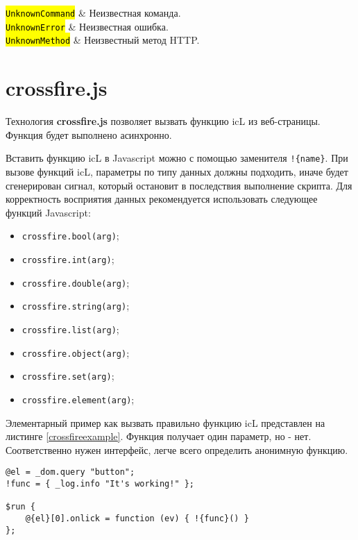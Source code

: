 \documentclass[a4paper, 14pt]{extarticle}
\newcommand{\ferror}[1]{\foreignlanguage{english}{\fontsize{11pt}{12pt}\tt{\sethlcolor{yellow}\hl{#1}}}}
\newenvironment{icItems}
	{ \begin{itemize} [noitemsep,nolistsep] }
	{ \end{itemize} }
\begin{document}
{	\ferror{UnknownCommand}          & \code{[w3c]} Неизвестная команда.                \\ \hline
	\ferror{UnknownError}            & \code{[w3c]} Неизвестная ошибка.                 \\ \hline
	\ferror{UnknownMethod}           & \code{[w3c]} Неизвестный метод HTTP.             \\
}

\section{crossfire.js}

Технология {\bf crossfire.js} позволяет вызвать функцию icL из веб-страницы. Функция будет выполнено асинхронно.

Вставить функцию icL в Javascript можно с помощью заменителя \lstinline|!{name}|. При вызове функций icL, параметры по типу данных должны подходить, иначе будет сгенерирован сигнал, который остановит в последствия выполнение скрипта. Для корректность восприятия данных рекомендуется использовать следующее функций Javascript:
\begin{icItems}
	\item \lstinline|crossfire.bool(arg)|;
	\item \lstinline|crossfire.int(arg)|;
	\item \lstinline|crossfire.double(arg)|;
	\item \lstinline|crossfire.string(arg)|;
	\item \lstinline|crossfire.list(arg)|;
	\item \lstinline|crossfire.object(arg)|;
	\item \lstinline|crossfire.set(arg)|;
	\item \lstinline|crossfire.element(arg)|;
\end{icItems}

Элементарный пример как вызвать правильно функцию icL представлен на листинге \ref{crossfireexample}. Функция  получает один параметр, но  - нет. Соответственно нужен интерфейс, легче всего определить анонимную функцию.


\begin{lstlisting}[caption=Пример вызова функций icL, label=crossfireexample]
@el = _dom.query "button";
!func = { _log.info "It's working!" };

$run {
	@{el}[0].onlick = function (ev) { !{func}() }
};
\end{lstlisting}
\end{document}
